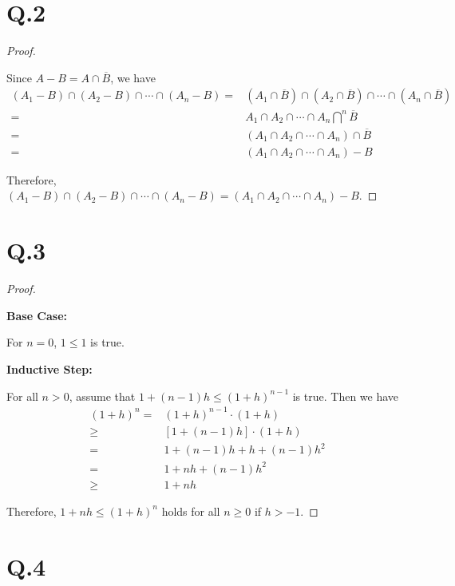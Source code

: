 \documentclass[a4paper,12pt]{article}
\begin{document}
\section*{Q.2}

\begin{proof}
$ $

Since $A - B = A \cap \overline{B}$, we have
\begin{align*}
	(A_1 - B) \cap (A_2 - B) \cap \cdots \cap (A_n - B) =& (A_1 \cap \overline{B}) \cap (A_2 \cap \overline{B}) \cap \cdots \cap (A_n \cap \overline{B}) \\
	=& A_1 \cap A_2 \cap \cdots \cap A_n \bigcap^{n} \overline{B} \\
	=& (A_1 \cap A_2 \cap \cdots \cap A_n) \cap \overline{B} \\
	=& (A_1 \cap A_2 \cap \cdots \cap A_n) - B
\end{align*}

Therefore, $(A_1 - B) \cap (A_2 - B) \cap \cdots \cap (A_n - B) = (A_1 \cap A_2 \cap \cdots \cap A_n) - B$.
\end{proof}

\section*{Q.3}

\begin{proof}
$ $

\textbf{Base Case:}

For $n = 0$, $1 \leq 1$ is true.

\textbf{Inductive Step:}

For all $n > 0$, assume that $1 + (n - 1)h \leq (1 + h)^{n - 1}$ is true.
Then we have
\begin{align*}
	(1 + h)^n =& (1 + h)^{n - 1} \cdot (1 + h) \\
	\geq& [1 + (n - 1)h] \cdot (1 + h) \\
	=& 1 + (n - 1)h + h + (n - 1)h^2 \\
	=& 1 + nh + (n - 1)h^2 \\
	\geq& 1 + nh
\end{align*}

Therefore, $1 + nh \leq (1 + h)^n$ holds for all $n \geq 0$ if $h > -1$.
\end{proof}

\section*{Q.4}
\end{document}
